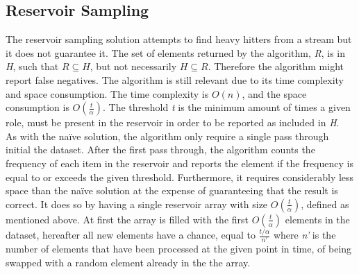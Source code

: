 \subsection{Reservoir Sampling}
The reservoir sampling solution attempts to find heavy hitters from a stream but it does not guarantee it. The set of elements returned by the algorithm, \textit{R}, is in \textit{H}, such that
\begin{math}
	R \subseteq H
\end{math}, but not necessarily 
\begin{math}
	H \subseteq R
\end{math}. Therefore the algorithm might report false negatives.
The algorithm is still relevant due to its time complexity and space consumption. The time complexity is \(O(n)\), and the space consumption is \(O(\frac{t}{\alpha})\). The threshold \textit{t} is the minimum amount of times a given role, must be present in the reservoir in order to be reported as included in \textit{H}. \\

As with the naïve solution, the algorithm only require a single pass through initial the dataset. After the first pass through, the algorithm counts the frequency of each item in the reservoir and reports the element if the frequency is equal to or exceeds the given threshold.
Furthermore, it requires considerably less space than the naïve solution at the expense of guaranteeing that the result is correct. It does so by having a single reservoir array with size \(O(\frac{t}{\alpha})\), defined as mentioned above. At first the array is filled with the first \(O(\frac{t}{\alpha})\) elements in the dataset, hereafter all new elements have a chance, equal to 
\begin{math}
	\frac{t/\alpha}{n'}
\end{math} where \textit{n'} is the number of elements that have been processed at the given point in time,
 of being swapped with a random element already in the the array.
 
